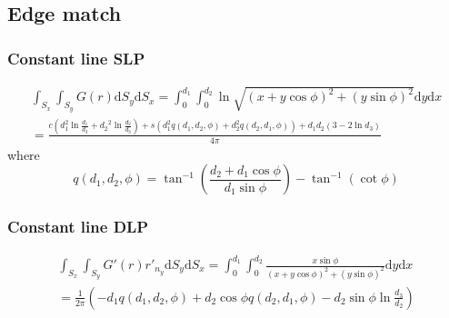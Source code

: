 \documentclass[a4paper,11pt]{article}
\newcommand{\td}{\mathrm{d}}
\begin{document}
\subsection{Edge match}

\subsubsection{Constant line SLP}

\begin{multline}
\int_{S_{x}} \int_{S_{y}} G(r) \td S_y \td S_x =
\int_{0}^{d_1} \int_{0}^{d_2}
\ln \sqrt{(x+y \cos\phi)^2 + (y\sin\phi)^2}
\td y \td x \\
=
\frac{
c \left(d_1^2 \ln \frac{d_1}{d_3} + {d_2}^2 \ln \frac{d_2}{d_3}\right)
+ s \left(d_1^2 q(d_1, d_2, \phi) + d_2^2 q(d_2, d_1, \phi)\right)
+ d_1 d_2 \left(3 - 2 \ln d_3 \right)
}{
4 \pi
}
\end{multline}
%
where
%
\begin{equation}
q(d_1, d_2, \phi) = \tan^{-1}\left(\frac{d_2 + d_1 \cos\phi}{d_1 \sin\phi}\right) - \tan^{-1}\left(\cot\phi\right)
\end{equation}

\subsubsection{Constant line DLP}

\begin{multline}
\int_{S_{x}} \int_{S_{y}} G'(r) r'_{n_{y}} \td S_y \td S_x =
\int_{0}^{d_1} \int_{0}^{d_2}
\frac{x\sin\phi}{(x+y \cos\phi)^2 + (y\sin\phi)^2}
\td y \td x \\
=
\frac{1}{2\pi}\left(-d_1 q(d_1, d_2, \phi) + d_2 \cos\phi q(d_2, d_1, \phi)
- d_2 \sin\phi \ln \frac{d_3}{d_2}\right)
\end{multline}
\end{document}
